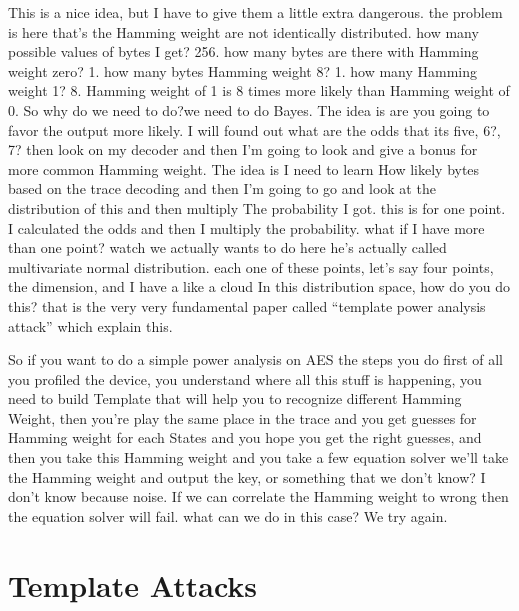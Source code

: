 This is a nice idea, but I have to give them a little extra dangerous. the
problem is here that's the Hamming weight are not identically distributed. how
many possible values of bytes I get? 256. how many bytes are there with Hamming
weight zero? 1. how many bytes Hamming weight 8? 1. how many Hamming weight 1?
8. Hamming weight of 1 is 8 times more likely than Hamming weight of 0. So why
do we need to do?we need to do Bayes. The idea is are you going to favor the
output more likely. I will found out what are the odds that its five, 6?, 7?
then look on my decoder and then I'm going to look and give a bonus for more
common Hamming weight. The idea is I need to learn How likely bytes based on the
trace decoding and then I'm going to go and look at the distribution of this and
then multiply The probability I got. this is for one point. I calculated the
odds and then I multiply the probability. what if I have more than one point?
watch we actually wants to do here he's actually called multivariate normal
distribution. each one of these points, let's say four points, the dimension,
and I have a like a cloud In this distribution space, how do you do this? that
is the very very fundamental paper called “template power analysis attack” which
explain this.

So if you want to do a simple power analysis on AES the steps you do first of
all you profiled the device, you understand where all this stuff is happening,
you need to build Template that will help you to recognize different Hamming
Weight, then you're play the same place in the trace and you get guesses for
Hamming weight for each States and you hope you get the right guesses, and then
you take this Hamming weight and you take a few equation solver we'll take the
Hamming weight and output the key, or something that we don't know? I don't know
because noise. If we can correlate the Hamming weight to wrong then the equation
solver will fail. what can we do in this case? We try again.

\newpage
\section{Template Attacks} 
